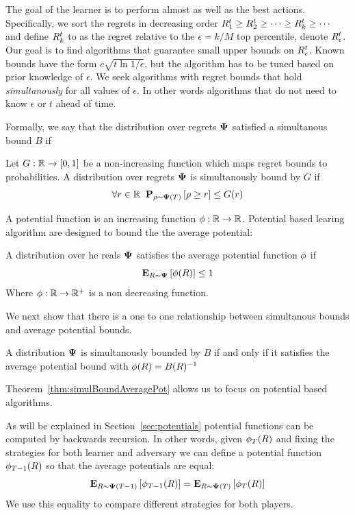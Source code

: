 \documentclass{article}[12pt]
\begin{document}
The goal of the learner is to perform almost as well as the best
actions. Specifically, we sort the regrets in decreasing order $R_1^t \geq
R_2^t \geq \cdots \geq R_k^t \geq \cdots$ and define $R_k^t$ to
as the regret relative to the $\epsilon=k/M$ top percentile, denote $R_\epsilon^t$. Our goal
is to find algorithms that guarantee small upper bounds on
$R_\epsilon^t$. Known bounds have the form $c \sqrt{t \ln
  {1/\epsilon}}$, but the algorithm has to be tuned based on prior
knowledge of $\epsilon$. We seek algorithms with regret bounds that hold {\em simultanously} for all values
of $\epsilon$. In other words algorithms that do not need to know
$\epsilon$ or $t$ ahead of time.

Formally, we say that the distribution over regrets ${\bf \Psi}$ satisfied a
simultanous bound $B$ if
\begin{definition} \label{def:unif-regret-bound} Let $G: \mathbb{R} \to [0,1]$ be a
  non-increasing function which maps regret bounds to probabilities.
  A distribution over regrets ${\bf \Psi}$ is simultanously bound by $G$ if
  \[
    \forall r \in \mathbb{R} \;\; {\bf P}_{\rho \sim {\bf \Psi}(T)}\left[ \rho \geq r \right] \leq G(r)
  \]
\end{definition}

A potential function is an increasing function
$\phi:\mathbb{R} \to \mathbb{R}$. Potential based learing algorithm
are designed to bound the the average potential:
\begin{definition} \label{def:aver-potential-bound}
  A distribution over he reals ${\bf \Psi}$ satisfies the average
  potential function $\phi$ if
  $${\bf E}_{R \sim {\bf \Psi}}\left[ \phi(R) \right] \leq 1$$
  Where $\phi: \mathbb{R} \to \mathbb{R}^+$ is a non decreasing function. 
\end{definition}

We next show that there is a one to one relationship between
simultanous bounds and average potential bounds. 
\begin{theorem}\label{thm:simulBoundAveragePot}
 A distribution ${\bf \Psi}$ is simultanously bounded by $B$ if and only
 if it satisfies the average potential bound with $\phi(R) = B(R)^{-1}$
\end{theorem}
Theorem~\ref{thm:simulBoundAveragePot} allows us to focus on potential
based algorithms.

As will be explained in Section~\ref{sec:potentials} potential
functions can be computed by backwards recursion. In other words,
given $\phi_T(R)$ and fixing the strategies for both learner and
adversary we can define a potential function $\phi_{T-1}(R)$ so that
the average potentials are equal:
\[
  {\bf E}_{R \sim {\bf \Psi}(T-1)}\left[ \phi_{T-1}(R) \right] = {\bf E}_{R \sim {\bf \Psi}(T)}\left[ \phi_T(R) \right]
  \]
  We use this equality to compare different strategies for both players.
\end{document}
